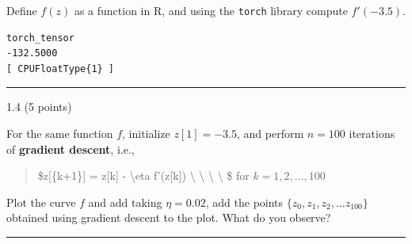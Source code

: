 \documentclass[
  letterpaper,
  DIV=11,
  numbers=noendperiod]{scrartcl}
\newenvironment{Shaded}{\begin{snugshade}}{\end{snugshade}}
\newcommand{\AttributeTok}[1]{\textcolor[rgb]{0.40,0.45,0.13}{#1}}
\newcommand{\ConstantTok}[1]{\textcolor[rgb]{0.56,0.35,0.01}{#1}}
\newcommand{\ControlFlowTok}[1]{\textcolor[rgb]{0.00,0.23,0.31}{#1}}
\newcommand{\DecValTok}[1]{\textcolor[rgb]{0.68,0.00,0.00}{#1}}
\newcommand{\FloatTok}[1]{\textcolor[rgb]{0.68,0.00,0.00}{#1}}
\newcommand{\FunctionTok}[1]{\textcolor[rgb]{0.28,0.35,0.67}{#1}}
\newcommand{\NormalTok}[1]{\textcolor[rgb]{0.00,0.23,0.31}{#1}}
\newcommand{\OtherTok}[1]{\textcolor[rgb]{0.00,0.23,0.31}{#1}}
\newcommand{\SpecialCharTok}[1]{\textcolor[rgb]{0.37,0.37,0.37}{#1}}
\begin{document}
Define \(f(z)\) as a function in R, and using the \texttt{torch} library
compute \(f'(-3.5)\).

\begin{Shaded}
\end{Shaded}

\begin{verbatim}
torch_tensor
-132.5000
[ CPUFloatType{1} ]
\end{verbatim}

\begin{center}\rule{0.5\linewidth}{0.5pt}\end{center}

1.4 (5 points)

For the same function \(f\), initialize \(z[1] = -3.5\), and perform
\(n=100\) iterations of \textbf{gradient descent}, i.e.,

\begin{quote}
\$z{[}\{k+1\}{]} = z{[}k{]} - \textbackslash eta f'(z{[}k{]})
\textbackslash{} \textbackslash{} \textbackslash{} \textbackslash{} \$
for \(k = 1, 2, \dots, 100\)
\end{quote}

Plot the curve \(f\) and add taking \(\eta = 0.02\), add the points
\(\{z_0, z_1, z_2, \dots z_{100}\}\) obtained using gradient descent to
the plot. What do you observe?

\begin{center}\rule{0.5\linewidth}{0.5pt}\end{center}
\end{document}
